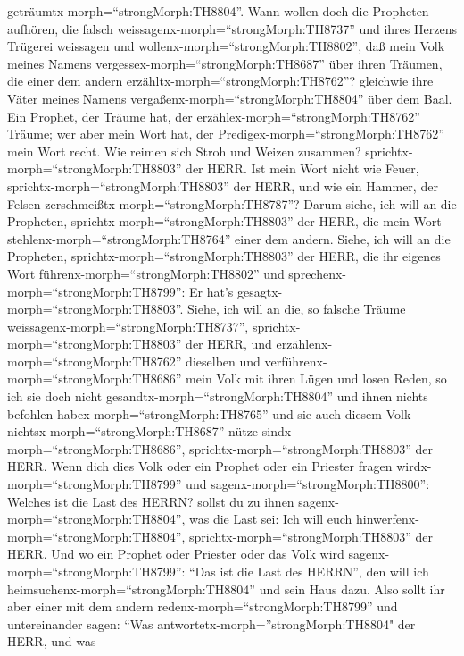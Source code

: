geträumtx-morph=``strongMorph:TH8804''.  Wann wollen doch
die Propheten aufhören, die falsch
weissagenx-morph=``strongMorph:TH8737'' und ihres Herzens Trügerei
weissagen  und wollenx-morph=``strongMorph:TH8802'', daß
mein Volk meines Namens vergessex-morph=``strongMorph:TH8687'' über
ihren Träumen, die einer dem andern
erzähltx-morph=``strongMorph:TH8762''? gleichwie ihre Väter meines
Namens vergaßenx-morph=``strongMorph:TH8804'' über dem Baal.
 Ein Prophet, der Träume hat, der
erzählex-morph=``strongMorph:TH8762'' Träume; wer aber mein Wort hat,
der Predigex-morph=``strongMorph:TH8762'' mein Wort recht. Wie reimen
sich Stroh und Weizen zusammen? sprichtx-morph=``strongMorph:TH8803''
der HERR.  Ist mein Wort nicht wie Feuer,
sprichtx-morph=``strongMorph:TH8803'' der HERR, und wie ein Hammer, der
Felsen zerschmeißtx-morph=``strongMorph:TH8787''?  Darum
siehe, ich will an die Propheten, sprichtx-morph=``strongMorph:TH8803''
der HERR, die mein Wort stehlenx-morph=``strongMorph:TH8764'' einer dem
andern.  Siehe, ich will an die Propheten,
sprichtx-morph=``strongMorph:TH8803'' der HERR, die ihr eigenes Wort
führenx-morph=``strongMorph:TH8802'' und
sprechenx-morph=``strongMorph:TH8799'': Er hat's
gesagtx-morph=``strongMorph:TH8803''.  Siehe, ich will an
die, so falsche Träume weissagenx-morph=``strongMorph:TH8737'',
sprichtx-morph=``strongMorph:TH8803'' der HERR, und
erzählenx-morph=``strongMorph:TH8762'' dieselben und
verführenx-morph=``strongMorph:TH8686'' mein Volk mit ihren Lügen und
losen Reden, so ich sie doch nicht gesandtx-morph=``strongMorph:TH8804''
und ihnen nichts befohlen habex-morph=``strongMorph:TH8765'' und sie
auch diesem Volk nichtsx-morph=``strongMorph:TH8687'' nütze
sindx-morph=``strongMorph:TH8686'',
sprichtx-morph=``strongMorph:TH8803'' der HERR.  Wenn dich
dies Volk oder ein Prophet oder ein Priester fragen
wirdx-morph=``strongMorph:TH8799'' und
sagenx-morph=``strongMorph:TH8800'': Welches ist die Last des HERRN?
sollst du zu ihnen sagenx-morph=``strongMorph:TH8804'', was die Last
sei: Ich will euch hinwerfenx-morph=``strongMorph:TH8804'',
sprichtx-morph=``strongMorph:TH8803'' der HERR.  Und wo ein
Prophet oder Priester oder das Volk wird
sagenx-morph=``strongMorph:TH8799'': ``Das ist die Last des HERRN'', den
will ich heimsuchenx-morph=``strongMorph:TH8804'' und sein Haus dazu.
 Also sollt ihr aber einer mit dem andern
redenx-morph=``strongMorph:TH8799'' und untereinander sagen: ``Was
antwortetx-morph=''strongMorph:TH8804" der HERR, und was

